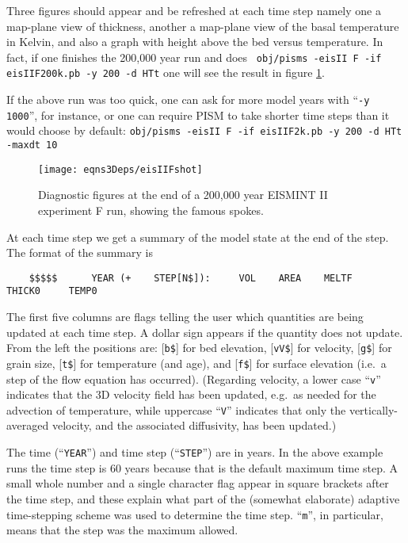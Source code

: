 \documentclass[11pt,final]{amsart}
\renewcommand{\t}[1]{\texttt{#1}}
\begin{document}
Three figures should appear and be refreshed at each time step namely one a map-plane view of thickness, another a map-plane view of the basal temperature in Kelvin, and also a graph with height above the bed versus temperature.  In fact, if one finishes the 200,000 year run and does \verb| obj/pisms -eisII F -if eisIIF200k.pb -y 200 -d HTt| one will see the result in figure \ref{fig:screenshot}.

If the above run was too quick, one can ask for more model years with ``\verb|-y 1000|'', for instance, or one can require PISM to take shorter time steps than it would choose by default: \verb|obj/pisms -eisII F -if eisIIF2k.pb -y 200 -d HTt -maxdt 10|
\medskip

\begin{figure}[ht]
\texttt{[image: eqns3Deps/eisIIFshot]}
\caption{Diagnostic figures at the end of a 200,000 year EISMINT II experiment F run, showing the famous spokes.}
\label{fig:screenshot}
\end{figure}

At each time step we get a summary of the model state at the end of the step.  The format of the summary is
\scriptsize\begin{verbatim}
    $$$$$      YEAR (+    STEP[N$]):     VOL    AREA    MELTF     THICK0     TEMP0
\end{verbatim}
\normalsize
The first five columns are flags telling the user which quantities are being updated at each time step.  A dollar sign appears if the quantity does not update.  From the left the positions are: [\t{b\$}] for bed elevation, [\t{vV\$}] for velocity, [\t{g\$}] for grain size, [\t{t\$}] for temperature (and age), and [\t{f\$}] for surface elevation (i.e.~a step of the flow equation has occurred).  (Regarding velocity, a lower case ``\texttt{v}'' indicates that the 3D velocity field has been updated, e.g.~as needed for the advection of temperature, while uppercase ``\texttt{V}'' indicates that only the vertically-averaged velocity, and the associated diffusivity, has been updated.)

The time (``\t{YEAR}'') and time step (``\t{STEP}'') are in years.  In the above example runs the time step is 60 years because that is the default maximum time step.  A small whole number and a single character flag appear in square brackets after the time step, and these explain what part of the (somewhat elaborate) adaptive time-stepping scheme was used to determine the time step.  ``\t{m}'', in particular, means that the step was the maximum allowed.
\end{document}
